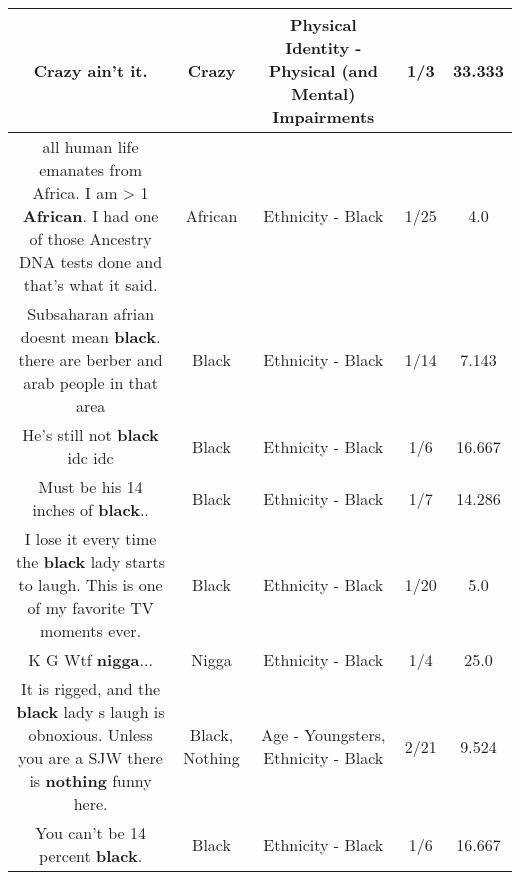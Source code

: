 \documentclass[11pt]{article}
\newlength\mylength
\begin{document}
\begin{center}
\begin{longtable}{|C{.65\mylength}|C{.30\mylength}|C{.12\mylength}|C{.12\mylength}|C{.12\mylength}|}
  \small Crazy ain't it.\normalsize   & Crazy & Physical Identity - Physical (and Mental) Impairments & 1/3 & 33.333 \\  \hline
  \small all human life  emanates from Africa. I am > 1 \textbf{African}. I had one of those Ancestry DNA  tests done and that's what it said.\normalsize   & African & Ethnicity - Black & 1/25 & 4.0 \\  \hline
  \small Subsaharan afrian doesnt mean \textbf{black}. there are berber and arab people in that area\normalsize   & Black & Ethnicity - Black & 1/14 & 7.143 \\  \hline
  \small He's still not \textbf{black} idc idc\normalsize   & Black & Ethnicity - Black & 1/6 & 16.667 \\  \hline
  \small Must be his 14 inches of \textbf{black}..\normalsize   & Black & Ethnicity - Black & 1/7 & 14.286 \\  \hline
  \small I lose it every time the \textbf{black} lady starts to laugh. This is one of my favorite TV moments ever.\normalsize   & Black & Ethnicity - Black & 1/20 & 5.0 \\  \hline
  \small K G Wtf \textbf{nigga}...\normalsize   & Nigga & Ethnicity - Black & 1/4 & 25.0 \\  \hline
  \small It is rigged, and the \textbf{black} lady s laugh is obnoxious. Unless you are a SJW there is \textbf{nothing} funny here.\normalsize   & Black, Nothing & Age - Youngsters, Ethnicity - Black & 2/21 & 9.524 \\  \hline
  \small You can't be 14 percent \textbf{black}.\normalsize   & Black & Ethnicity - Black & 1/6 & 16.667 \\  \hline

\end{longtable}
\end{center}
\end{document}
